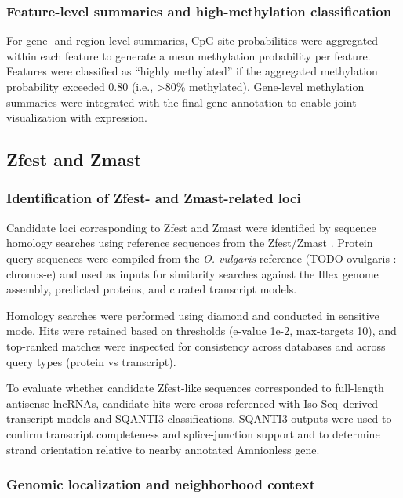 \documentclass[11pt]{article}
\begin{document}
\subsubsection{Feature-level summaries and high-methylation classification}

For gene- and region-level summaries, CpG-site probabilities were aggregated within each feature to generate a mean methylation probability per feature. Features were classified as “highly methylated” if the aggregated methylation probability exceeded 0.80 (i.e., >80\% methylated). Gene-level methylation summaries were integrated with the final gene annotation to enable joint visualization with expression.

\subsection{Zfest and Zmast}

\subsubsection{Identification of Zfest- and Zmast-related loci}

Candidate loci corresponding to Zfest and Zmast were identified by sequence homology searches using reference sequences from the Zfest/Zmast \cite{Papanicolaou2024.12.09.627507}. Protein query sequences were compiled from the \textit{O. vulgaris} reference (TODO ovulgaris : chrom:s-e) and used as inputs for similarity searches against the Illex genome assembly, predicted proteins, and curated transcript models. 

Homology searches were performed using diamond and conducted in sensitive mode. Hits were retained based on thresholds (e-value 1e-2, max-targets 10), and top-ranked matches were inspected for consistency across databases and across query types (protein vs transcript).

To evaluate whether candidate Zfest-like sequences corresponded to full-length antisense lncRNAs, candidate hits were cross-referenced with Iso-Seq–derived transcript models and SQANTI3 classifications. SQANTI3 outputs were used to confirm transcript completeness and splice-junction support and to determine strand orientation relative to nearby annotated Amnionless gene.

\subsubsection{Genomic localization and neighborhood context}
\end{document}
